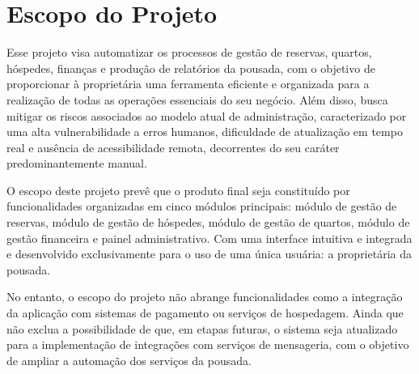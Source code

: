 \documentclass[
	12pt,				%
	openany,			%
	twoside,			%
	a4paper,			%
	english,			%
	french,				%
	spanish,			%
	brazil				%
	]{abntex2}
\begin{document}
\section{Escopo do Projeto}
Esse projeto visa automatizar os processos de gestão de reservas, quartos, hóspedes, finanças e produção de relatórios da pousada, com o objetivo de proporcionar à proprietária uma ferramenta eficiente e organizada para a realização de todas as operações essenciais do seu negócio. Além disso, busca mitigar os riscos associados ao modelo atual de administração, caracterizado por uma alta vulnerabilidade a erros humanos, dificuldade de atualização em tempo real e ausência de acessibilidade remota, decorrentes do seu caráter predominantemente manual.

O escopo deste projeto prevê que o produto final seja constituído por funcionalidades organizadas em cinco módulos principais: módulo de gestão de reservas, módulo de gestão de hóspedes, módulo de gestão de quartos, módulo de gestão financeira e painel administrativo. Com uma interface intuitiva e integrada e desenvolvido exclusivamente para o uso de uma única usuária: a proprietária da pousada.

No entanto, o escopo do projeto não abrange funcionalidades como a integração da aplicação com sistemas de pagamento ou serviços de hospedagem. Ainda que não exclua a possibilidade de que, em etapas futuras, o sistema seja atualizado para a implementação de integrações com serviços de mensageria, com o objetivo de ampliar a automação dos serviços da pousada.
\end{document}
